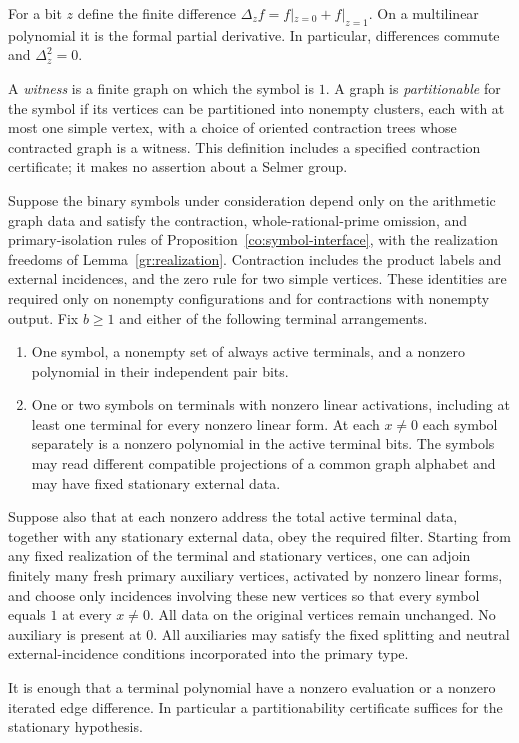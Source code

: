 For a bit $z$ define the finite difference
$\Delta_z f=f|_{z=0}+f|_{z=1}$.  On a multilinear polynomial it is the
formal partial derivative.  In particular, differences commute and
$\Delta_z^2=0$.

\begin{definition}\label{gr:partitionable}
A \emph{witness} is a finite graph on which the
symbol is $1$.  A graph is \emph{partitionable} for the symbol if its vertices
can be partitioned into nonempty clusters, each with at most one simple
vertex, with a choice of oriented contraction trees whose contracted graph
is a witness.
This definition includes a specified contraction certificate; it makes no
assertion about a Selmer group.
\end{definition}

\begin{theorem}\label{gr:address}
Suppose the binary symbols under consideration depend only on the
arithmetic graph data and satisfy the contraction, whole-rational-prime
omission, and primary-isolation rules of
Proposition~\ref{co:symbol-interface}, with the realization freedoms
of Lemma~\ref{gr:realization}.  Contraction includes the product labels
and external incidences, and the zero rule for two simple vertices.
These identities are required only on nonempty configurations and for
contractions with nonempty output.
Fix $b\ge1$ and either of the following terminal arrangements.
\begin{enumerate}
\item One symbol, a nonempty set of always active terminals, and a
nonzero polynomial in their independent pair bits.
\item One or two symbols on terminals with nonzero linear activations,
including at least one terminal for every nonzero linear form.  At each
$x\ne0$ each symbol separately is a nonzero polynomial in the active
terminal bits.  The symbols may read different compatible projections
of a common graph alphabet and may have fixed stationary external data.
\end{enumerate}
Suppose also that at each nonzero address the total active terminal data,
together with any stationary external data, obey the required filter.
Starting from any fixed realization of the terminal and stationary
vertices, one can adjoin finitely many fresh primary auxiliary vertices,
activated by nonzero linear forms, and choose only incidences involving
these new vertices so that every symbol equals $1$ at every $x\ne0$.
All data on the original vertices remain unchanged.  No auxiliary is
present at $0$.  All auxiliaries may satisfy the fixed splitting and
neutral external-incidence conditions incorporated into the primary type.

It is enough that a terminal polynomial have a nonzero evaluation or
a nonzero iterated edge difference.  In particular a partitionability
certificate suffices for the stationary hypothesis.
\end{theorem}

